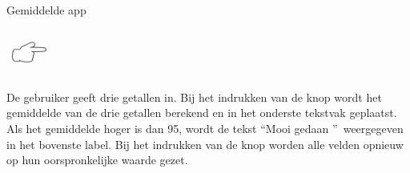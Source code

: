 \begin{opdracht}{Gemiddelde app}
	\begin{minipage}{.1\linewidth}
		\includegraphics[width=1.5cm]{inputs/opdracht}
		\vspace{3cm}
	\end{minipage}
	\begin{minipage}{.5\linewidth}
		De gebruiker geeft drie getallen in. Bij het indrukken van de knop wordt het gemiddelde van de drie getallen berekend en in het onderste tekstvak geplaatst. Als het gemiddelde hoger is dan 95, wordt de tekst \textquotedblleft Mooi gedaan  \textquotedblright \ weergegeven in het bovenste label. Bij het indrukken van de knop worden alle velden opnieuw op hun oorspronkelijke waarde gezet.
	\end{minipage}
	\begin{minipage}{.3\linewidth}
	\end{minipage}
	

\end{opdracht}
